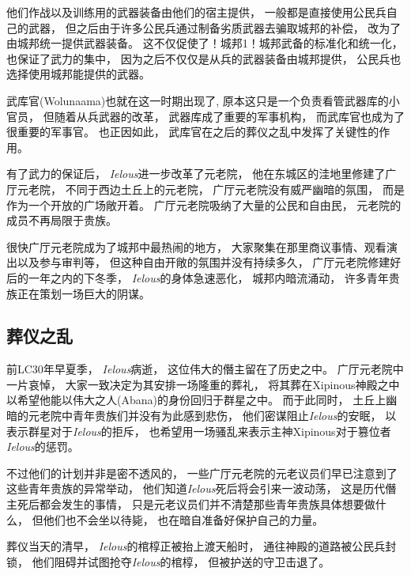 \documentclass[12pt, a4paper]{ctexart}
\begin{document}
        他们作战以及训练用的武器装备由他们的宿主提供，
        一般都是直接使用公民兵自己的武器，
        但之后由于许多公民兵通过制备劣质武器去骗取城邦的补偿，
        改为了由城邦统一提供武器装备。
        这不仅促使了！城邦1！城邦武备的标准化和统一化，
        也保证了武力的集中，
        因为之后不仅仅是从兵的武器装备由城邦提供，
        公民兵也选择使用城邦能提供的武器。
        
        武库官(Wolunaama)也就在这一时期出现了,
        原本这只是一个负责看管武器库的小官员，
        但随着从兵武器的改革，
        武器库成了重要的军事机构，
        而武库官也成为了很重要的军事官。
        也正因如此，
        武库官在之后的葬仪之乱中发挥了关键性的作用。

        有了武力的保证后，
        \emph{Ielous}进一步改革了元老院，
        他在东城区的洼地里修建了广厅元老院，
        不同于西边土丘上的元老院，
        广厅元老院没有威严幽暗的氛围，
        而是作为一个开放的广场敞开着。
        广厅元老院吸纳了大量的公民和自由民，
        元老院的成员不再局限于贵族。

        很快广厅元老院成为了城邦中最热闹的地方，
        大家聚集在那里商议事情、观看演出以及参与审判等，
        但这种自由开敞的氛围并没有持续多久，
        广厅元老院修建好后的一年之内的下冬季，
        \emph{Ielous}的身体急速恶化，
        城邦内暗流涌动，
        许多青年贵族正在策划一场巨大的阴谋。
    \subsection{葬仪之乱}
        前LC30年早夏季，
        \emph{Ielous}病逝，
        这位伟大的僭主留在了历史之中。
        广厅元老院中一片哀悼，
        大家一致决定为其安排一场隆重的葬礼，
        将其葬在Xipinous神殿之中以希望他能以伟大之人(Abana)的身份回归于群星之中。
        而于此同时，
        土丘上幽暗的元老院中青年贵族们并没有为此感到悲伤，
        他们密谋阻止\emph{Ielous}的安眠，
        以表示群星对于\emph{Ielous}的拒斥，
        也希望用一场骚乱来表示主神Xipinous对于篡位者\emph{Ielous}的惩罚。

        不过他们的计划并非是密不透风的，
        一些广厅元老院的元老议员们早已注意到了这些青年贵族的异常举动，
        他们知道\emph{Ielous}死后将会引来一波动荡，
        这是历代僭主死后都会发生的事情，
        只是元老议员们并不清楚那些青年贵族具体想要做什么，
        但他们也不会坐以待毙，
        也在暗自准备好保护自己的力量。

        葬仪当天的清早，
        \emph{Ielous}的棺椁正被抬上渡天船时，
        通往神殿的道路被公民兵封锁，
        他们阻碍并试图抢夺\emph{Ielous}的棺椁，
        但被护送的守卫击退了。
\end{document}
